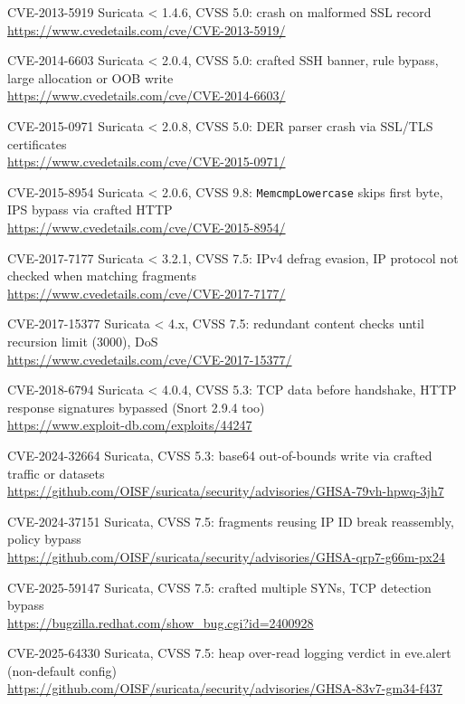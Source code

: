 \documentclass[Screen16to9,17pt]{foils}
\begin{document}
\begin{list2}
\item CVE-2013-5919 Suricata < 1.4.6, CVSS 5.0: crash on malformed SSL record\\
      \url{https://www.cvedetails.com/cve/CVE-2013-5919/}
\item CVE-2014-6603 Suricata < 2.0.4, CVSS 5.0: crafted SSH banner, rule bypass,
      large allocation or OOB write\\
      \url{https://www.cvedetails.com/cve/CVE-2014-6603/}
\item CVE-2015-0971 Suricata < 2.0.8, CVSS 5.0: DER parser crash via
      SSL/TLS certificates\\
      \url{https://www.cvedetails.com/cve/CVE-2015-0971/}
\item CVE-2015-8954 Suricata < 2.0.6, CVSS 9.8: \verb+MemcmpLowercase+ skips
      first byte, IPS bypass via crafted HTTP\\
      \url{https://www.cvedetails.com/cve/CVE-2015-8954/}
\item CVE-2017-7177 Suricata < 3.2.1, CVSS 7.5: IPv4 defrag evasion,
      IP protocol not checked when matching fragments\\
      \url{https://www.cvedetails.com/cve/CVE-2017-7177/}
\item CVE-2017-15377 Suricata < 4.x, CVSS 7.5: redundant content checks
      until recursion limit (3000), DoS\\
      \url{https://www.cvedetails.com/cve/CVE-2017-15377/}
\end{list2}


\begin{list2}
\item CVE-2018-6794 Suricata < 4.0.4, CVSS 5.3: TCP data before handshake,
      HTTP response signatures bypassed (Snort 2.9.4 too)\\
      \url{https://www.exploit-db.com/exploits/44247}
\item CVE-2024-32664 Suricata, CVSS 5.3: base64 out-of-bounds write
      via crafted traffic or datasets\\
      \url{https://github.com/OISF/suricata/security/advisories/GHSA-79vh-hpwq-3jh7}
\item CVE-2024-37151 Suricata, CVSS 7.5: fragments reusing IP ID break
      reassembly, policy bypass\\
      \url{https://github.com/OISF/suricata/security/advisories/GHSA-qrp7-g66m-px24}
\item CVE-2025-59147 Suricata, CVSS 7.5: crafted multiple SYNs, TCP
      detection bypass\\
      \url{https://bugzilla.redhat.com/show_bug.cgi?id=2400928}
\item CVE-2025-64330 Suricata, CVSS 7.5: heap over-read logging verdict
      in eve.alert (non-default config)\\
      \url{https://github.com/OISF/suricata/security/advisories/GHSA-83v7-gm34-f437}
\end{list2}
\end{document}
